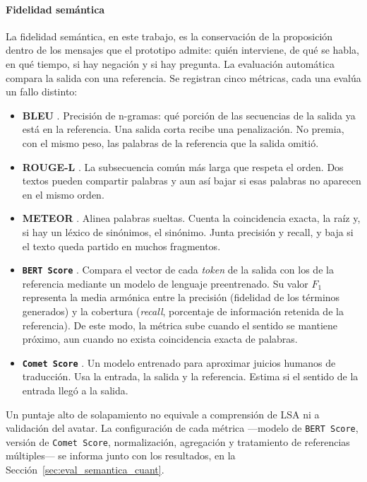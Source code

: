 \paragraph{Fidelidad semántica}
\label{sec:fidelidad_semantica}
La fidelidad semántica, en este trabajo, es la conservación de la proposición dentro de los mensajes que el prototipo admite: quién interviene, de qué se habla, en qué tiempo, si hay negación y si hay pregunta. La evaluación automática compara la salida con una referencia. Se registran cinco métricas, cada una evalúa un fallo distinto:

\begin{itemize}
    \item \textbf{BLEU} \parencite{papineni2002bleu}. Precisión de n-gramas: qué porción de las secuencias de la salida ya está en la referencia. Una salida corta recibe una penalización. No premia, con el mismo peso, las palabras de la referencia que la salida omitió.
    \item \textbf{ROUGE-L} \parencite{lin2004rouge}. La subsecuencia común más larga que respeta el orden. Dos textos pueden compartir palabras y aun así bajar si esas palabras no aparecen en el mismo orden.
    \item \textbf{METEOR} \parencite{banerjee2005meteor}. Alinea palabras sueltas. Cuenta la coincidencia exacta, la raíz y, si hay un léxico de sinónimos, el sinónimo. Junta precisión y recall, y baja si el texto queda partido en muchos fragmentos.
    \item \textbf{\texttt{BERT Score}} \parencite{zhang2020bertscore}. Compara el vector de cada \textit{token} de la salida con los de la referencia mediante un modelo de lenguaje preentrenado. Su valor $F_1$ representa la media armónica entre la precisión (fidelidad de los términos generados) y la cobertura (\textit{recall}, porcentaje de información retenida de la referencia). De este modo, la métrica sube cuando el sentido se mantiene próximo, aun cuando no exista coincidencia exacta de palabras.
    \item \textbf{\texttt{Comet Score}} \parencite{rei2020comet}. Un modelo entrenado para aproximar juicios humanos de traducción. Usa la entrada, la salida y la referencia. Estima si el sentido de la entrada llegó a la salida.
\end{itemize}

Un puntaje alto de solapamiento no equivale a comprensión de LSA ni a validación del avatar. La configuración de cada métrica ---modelo de \texttt{BERT Score}, versión de \texttt{Comet Score}, normalización, agregación y tratamiento de referencias múltiples--- se informa junto con los resultados, en la Sección~\ref{sec:eval_semantica_cuant}.

